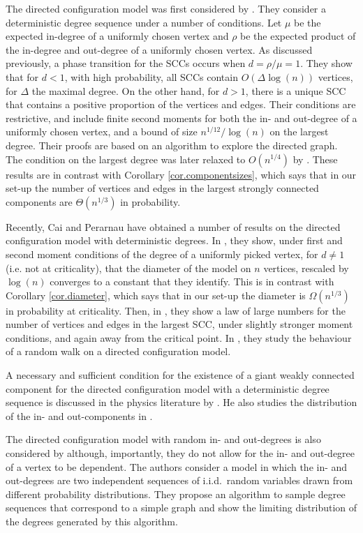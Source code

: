 The directed configuration model was first considered by \citet{cooperSizeLargestStrongly2004}. They consider a deterministic degree sequence under a number of conditions. Let $\mu$ be the expected in-degree of a uniformly chosen vertex and $\rho$ be the expected product of the in-degree and out-degree of a uniformly chosen vertex. As discussed previously, a phase transition for the SCCs occurs when $d=\rho/\mu=1$. They show that for $d<1$, with high probability, all SCCs contain $O(\Delta\log(n))$ vertices, for $\Delta$ the maximal degree. On the other hand, for $d>1$, there is a unique SCC that contains a positive proportion of the vertices and edges. Their conditions are restrictive, and include finite second moments for both the in- and out-degree of a uniformly chosen vertex, and a bound of size $n^{1/12}/\log(n)$ on the largest degree. Their proofs are based on an algorithm to explore the directed graph. The condition on the largest degree was later relaxed to $O(n^{1/4})$ by \citet{Graf2016}. These results are in contrast with Corollary \ref{cor.componentsizes}, which says that in our set-up the number of vertices and edges in the largest strongly connected components are $\Theta(n^{1/3})$ in probability.

Recently, Cai and Perarnau have obtained a number of results on the directed configuration model with deterministic degrees. In \cite{caiDiameterDirectedConfiguration2020}, they show, under first and second moment conditions of the degree of a uniformly picked vertex, for $d\neq 1$ (i.e. not at criticality), that the diameter of the model on $n$ vertices, rescaled by $\log(n)$ converges to a constant that they identify. This is in contrast with Corollary \ref{cor.diameter}, which says that in our set-up the diameter is $\Omega(n^{1/3})$ in probability at criticality. Then, in \cite{caiGiantComponentDirected2020}, they show a law of large numbers for the number of vertices and edges in the largest SCC, under slightly stronger moment conditions, and again away from the critical point. In \cite{cai2021rw}, they study the behaviour of a random walk on a directed configuration model.
 
A necessary and sufficient condition for the existence of a giant weakly connected component for the directed configuration model with a deterministic degree sequence is discussed in the physics literature by \citet{Kryven2016}. He also studies the distribution of the in- and out-components in \cite{Kryven2017}.

The directed configuration model with random in- and out-degrees is also considered by \citet{chenDirectedRandomGraphs2013} although, importantly, they do not allow for the in- and out-degree of a vertex to be dependent. The authors consider a model in which the in- and out-degrees are two independent sequences of i.i.d.\ random variables drawn from different probability distributions. They propose an algorithm to sample degree sequences that correspond to a simple graph and show the limiting distribution of the degrees generated by this algorithm. 



